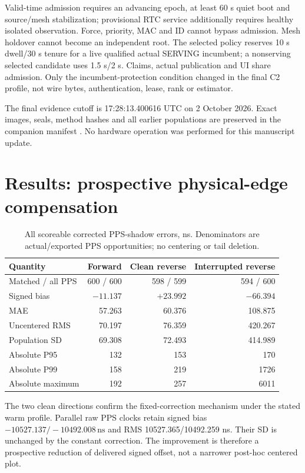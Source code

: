 \documentclass[11pt,letterpaper]{article}
\newcommand{\ns}{\,\mathrm{ns}}
\newcommand{\page}{\clearpage}
\begin{document}
Valid-time admission requires an advancing epoch, at least 60 s quiet boot and source/mesh stabilization; provisional RTC service additionally requires healthy isolated observation. Force, priority, MAC and ID cannot bypass admission. Mesh holdover cannot become an independent root. The selected policy reserves 10 s dwell/30 s tenure for a live qualified actual SERVING incumbent; a nonserving selected candidate uses 1.5 s/2 s. Claims, actual publication and UI share admission. Only the incumbent-protection condition changed in the final C2 profile, not wire bytes, authentication, lease, rank or estimator.

The final evidence cutoff is 17:28:13.400616 UTC on 2 October 2026. Exact images, seals, method hashes and all earlier populations are preserved in the companion manifest \cite{evidence}. No hardware operation was performed for this manuscript update.
\page
\section{Results: prospective physical-edge compensation}

\begin{table}[h]\centering\small
\caption{All scoreable corrected PPS-shadow errors, ns. Denominators are actual/exported PPS opportunities; no centering or tail deletion.}\label{tab:tc}
\begin{tabular}{@{}lrrr@{}}\toprule
Quantity & Forward & Clean reverse & Interrupted reverse \\\midrule
Matched / all PPS & 600 / 600 & 598 / 599 & 594 / 600 \\
Signed bias & $-11.137$ & $+23.992$ & $-66.394$ \\
MAE & 57.263 & 60.376 & 108.875 \\
Uncentered RMS & 70.197 & 76.359 & 420.267 \\
Population SD & 69.308 & 72.493 & 414.989 \\
Absolute P95 & 132 & 153 & 170 \\
Absolute P99 & 158 & 219 & 1726 \\
Absolute maximum & 192 & 257 & 6011 \\\bottomrule
\end{tabular}
\end{table}

The two clean directions confirm the fixed-correction mechanism under the stated warm profile. Parallel raw PPS clocks retain signed bias $-10527.137/-10492.008\ns$ and RMS 10527.365/10492.259 ns. Their SD is unchanged by the constant correction. The improvement is therefore a prospective reduction of delivered signed offset, not a narrower post-hoc centered plot.
\end{document}
